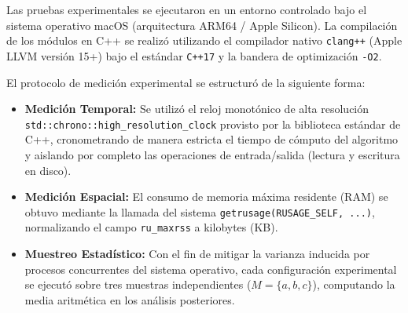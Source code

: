 Las pruebas experimentales se ejecutaron en un entorno controlado bajo el sistema operativo macOS (arquitectura ARM64 / Apple Silicon). La compilación de los módulos en C++ se realizó utilizando el compilador nativo \texttt{clang++} (Apple LLVM versión 15+) bajo el estándar \texttt{C++17} y la bandera de optimización \texttt{-O2}.

El protocolo de medición experimental se estructuró de la siguiente forma:
\begin{itemize}
    \item \textbf{Medición Temporal:} Se utilizó el reloj monotónico de alta resolución \texttt{std::chrono::high\_resolution\_clock} provisto por la biblioteca estándar de C++, cronometrando de manera estricta el tiempo de cómputo del algoritmo y aislando por completo las operaciones de entrada/salida (lectura y escritura en disco).
    \item \textbf{Medición Espacial:} El consumo de memoria máxima residente (RAM) se obtuvo mediante la llamada del sistema \texttt{getrusage(RUSAGE\_SELF, ...)}, normalizando el campo \texttt{ru\_maxrss} a kilobytes (KB).
    \item \textbf{Muestreo Estadístico:} Con el fin de mitigar la varianza inducida por procesos concurrentes del sistema operativo, cada configuración experimental se ejecutó sobre tres muestras independientes ($M = \{a, b, c\}$), computando la media aritmética en los análisis posteriores.
\end{itemize}